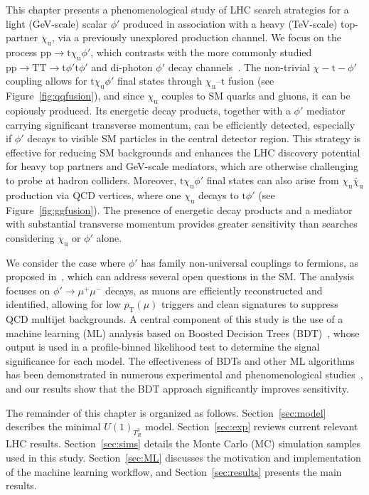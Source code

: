 This chapter presents a phenomenological study of LHC search strategies for a light (GeV-scale) scalar $\phi'$ produced in association with a heavy (TeV-scale) top-partner $\chi_\mathrm{u}$, via a previously unexplored production channel. We focus on the process $\mathrm{pp}\to \mathrm{t}\chi_\mathrm{u} \phi'$, which contrasts with the more commonly studied $\mathrm{pp}\to \mathrm{T}\mathrm{T}\to \mathrm{t}\phi'\mathrm{t}\phi'$ and di-photon $\phi'$ decay channels~\parencite{Bhardwaj_2022, Bhardwaj_2022_2, Bardhan_2023, Banerjee_2016, Alves_2024}. The non-trivial $\chi - \mathrm{t} -\phi'$ coupling allows for $\mathrm{t}\chi_\mathrm{u} \phi'$ final states through $\chi_\mathrm{u}$--$\mathrm{t}$ fusion (see Figure~\ref{fig:qqfusion}), and since $\chi_\mathrm{u}$ couples to SM quarks and gluons, it can be copiously produced. Its energetic decay products, together with a $\phi'$ mediator carrying significant transverse momentum, can be efficiently detected, especially if $\phi'$ decays to visible SM particles in the central detector region. This strategy is effective for reducing SM backgrounds and enhances the LHC discovery potential for heavy top partners and GeV-scale mediators, which are otherwise challenging to probe at hadron colliders. Moreover, $\mathrm{t}\chi_\mathrm{u} \phi'$ final states can also arise from $\chi_\mathrm{u}\bar\chi_\mathrm{u}$ production via QCD vertices, where one $\chi_\mathrm{u}$ decays to $\mathrm{t}\phi'$ (see Figure~\ref{fig:ggfusion}). The presence of energetic decay products and a mediator with substantial transverse momentum provides greater sensitivity than searches considering $\chi_\mathrm{u}$ or $\phi'$ alone.

We consider the case where $\phi'$ has family non-universal couplings to fermions, as proposed in~\parencite{Dutta2020}, which can address several open questions in the SM. The analysis focuses on $\phi'\to\mu^+\mu^-$ decays, as muons are efficiently reconstructed and identified, allowing for low $p_{\mathrm{T}}(\mu)$ triggers and clean signatures to suppress QCD multijet backgrounds. A central component of this study is the use of a machine learning (ML) analysis based on Boosted Decision Trees (BDT)~\parencite{friedman_greedy_2001}, whose output is used in a profile-binned likelihood test to determine the signal significance for each model. The effectiveness of BDTs and other ML algorithms has been demonstrated in numerous experimental and phenomenological studies~\parencite{Ai:2022qvs, ATLAS:2017fak, Biswas:2018snp, Chung:2020ysf, Feng:2021eke, ttZprime, Chigusa:2022svv, Florez2023, Arganda2024, Ajmal_2024, Dutta_2015}, and our results show that the BDT approach significantly improves sensitivity.

The remainder of this chapter is organized as follows. Section~\ref{sec:model} describes the minimal $U(1)_{T^3_R}$ model. Section~\ref{sec:exp} reviews current relevant LHC results. Section~\ref{sec:sims} details the Monte Carlo (MC) simulation samples used in this study. Section~\ref{sec:ML} discusses the motivation and implementation of the machine learning workflow, and Section~\ref{sec:results} presents the main results.

